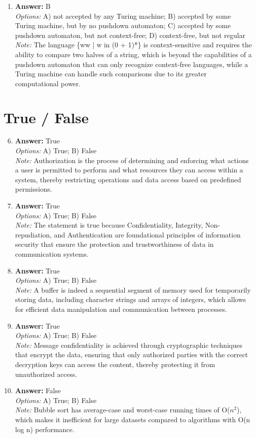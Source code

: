 \documentclass[12pt]{article}
\begin{document}
\begin{enumerate}[label=\arabic*.]
\item \textbf{Answer:} B
\\ \textit{Options:} A) not accepted by any Turing machine; B) accepted by some Turing machine, but by no pushdown automaton; C) accepted by some pushdown automaton, but not context-free; D) context-free, but not regular
\\ \textit{Note:} The language \{ww | w in (0 + 1)*\} is context-sensitive and requires the ability to compare two halves of a string, which is beyond the capabilities of a pushdown automaton that can only recognize context-free languages, while a Turing machine can handle such comparisons due to its greater computational power.
\end{enumerate}

\section*{True / False}
\begin{enumerate}[label=\arabic*.]
\setcounter{enumi}{5}
\item \textbf{Answer:} True
\\ \textit{Options:} A) True; B) False
\\ \textit{Note:} Authorization is the process of determining and enforcing what actions a user is permitted to perform and what resources they can access within a system, thereby restricting operations and data access based on predefined permissions.
\item \textbf{Answer:} True
\\ \textit{Options:} A) True; B) False
\\ \textit{Note:} The statement is true because Confidentiality, Integrity, Non-repudiation, and Authentication are foundational principles of information security that ensure the protection and trustworthiness of data in communication systems.
\item \textbf{Answer:} True
\\ \textit{Options:} A) True; B) False
\\ \textit{Note:} A buffer is indeed a sequential segment of memory used for temporarily storing data, including character strings and arrays of integers, which allows for efficient data manipulation and communication between processes.
\item \textbf{Answer:} True
\\ \textit{Options:} A) True; B) False
\\ \textit{Note:} Message confidentiality is achieved through cryptographic techniques that encrypt the data, ensuring that only authorized parties with the correct decryption keys can access the content, thereby protecting it from unauthorized access.
\item \textbf{Answer:} False
\\ \textit{Options:} A) True; B) False
\\ \textit{Note:} Bubble sort has average-case and worst-case running times of O($n^2$), which makes it inefficient for large datasets compared to algorithms with O(n log n) performance.
\end{enumerate}
\end{document}

